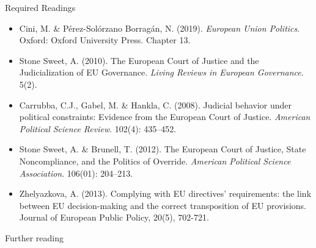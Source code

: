 \noindent Required Readings

\begin{itemize}
	\item Cini, M. \& P\'{e}rez-Sol\'{o}rzano Borrag\'{a}n, N. (2019). \textit{European Union Politics}. Oxford: Oxford University Press. Chapter 13.
	\item Stone Sweet, A. (2010). The European Court of Justice and the Judicialization of EU Governance. \textit{Living Reviews in European Governance}. 5(2).
	\item Carrubba, C.J., Gabel, M. \& Hankla, C. (2008). Judicial behavior under political constraints: Evidence from the European Court of Justice. \textit{American Political Science Review}. 102(4): 435–452.
	\item Stone Sweet, A. \& Brunell, T. (2012). The European Court of Justice, State Noncompliance, and the Politics of Override. \textit{American Political Science Association}. 106(01): 204–213.
	\item Zhelyazkova, A. (2013). Complying with EU directives' requirements: the link between EU decision-making and the correct transposition of EU provisions. Journal of European Public Policy, 20(5), 702-721.
\end{itemize}

\noindent Further reading

